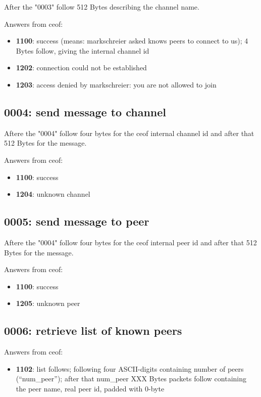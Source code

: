 \documentclass[12pt,a4paper]{article}
\begin{document}
After the "0003" follow 512 Bytes describing the channel name.

Answers from ceof:

\begin{itemize}
\item \textbf{1100}: success (means: markschreier asked knows peers to connect to us); 4 Bytes follow, giving the internal channel id
\item \textbf{1202}: connection could not be established
\item \textbf{1203}: access denied by markschreier: you are not allowed to join
\end{itemize}


\subsection{0004: send message to channel}

Aftere the "0004" follow four bytes for the ceof internal channel id and after that 512 Bytes for the message.

Answers from ceof:

\begin{itemize}
\item \textbf{1100}: success
\item \textbf{1204}: unknown channel
\end{itemize}


\subsection{0005: send message to peer}

Aftere the "0004" follow four bytes for the ceof internal peer id and after that 512 Bytes for the message.

Answers from ceof:

\begin{itemize}
\item \textbf{1100}: success
\item \textbf{1205}: unknown peer
\end{itemize}


\subsection{0006: retrieve list of known peers}
Answers from ceof:
\begin{itemize}
\item \textbf{1102}: list follows; following four ASCII-digits containing number
of peers ("`num\_peer"'); after that  num\_peer
XXX Bytes packets follow containing the peer name, real peer id, padded with 0-byte
\end{itemize}
\end{document}

